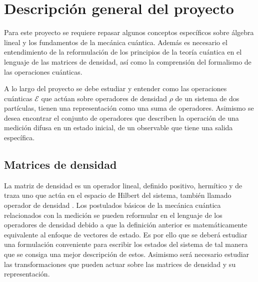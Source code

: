 \section{Descripción general del proyecto}



Para este proyecto se requiere repasar algunos conceptos específicos sobre álgebra lineal y los fundamentos de la mecánica cuántica. Además es necesario el entendimiento de la reformulación de los principios de la teoría cuántica en el lenguaje de las matrices de densidad, así como la comprensión del formalismo de las operaciones cuánticas.

 A lo largo del proyecto se debe estudiar y entender como las operaciones cuánticas $\mathcal{E}$ que actúan sobre operadores de densidad $\rho$ de un sistema de dos partículas, tienen una representación como una suma de operadores. Asimismo se desea encontrar el conjunto de operadores que describen la operación de una medición difusa en un estado inicial, de un observable que tiene una salida específica.





\subsection{Matrices de densidad}

La matriz de densidad es un operador lineal, definido positivo, hermítico y de traza uno que actúa en el espacio de Hilbert del sistema, también llamado operador de densidad \cite{nielsen_chuang_2010}. Los postulados básicos de la mecánica cuántica relacionados con la medición se pueden reformular en el lenguaje de los operadores de densidad debido a que la definición anterior es matemáticamente equivalente al enfoque de vectores de estado. Es por ello que se deberá estudiar una formulación conveniente para escribir los estados del sistema de tal manera que se consiga una mejor descripción de estos. Asimismo será necesario estudiar las transformaciones que pueden actuar sobre las matrices de densidad y su representación.


